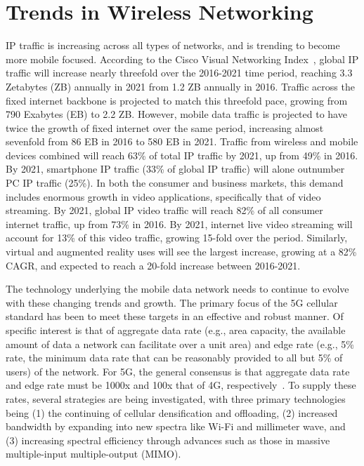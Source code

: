\documentclass[12pt,dvipsnames]{report}
\begin{document}
\section{Trends in Wireless Networking} \label{sec:netreview}

IP traffic is increasing across all types of networks, and is trending to become more mobile focused.  According to the Cisco Visual Networking Index~\cite{ciscoVNI2017}, global IP traffic will increase nearly threefold over the 2016-2021 time period, reaching 3.3 Zetabytes (ZB) annually in 2021 from 1.2 ZB annually in 2016.  Traffic across the fixed internet backbone is projected to match this threefold pace, growing from 790 Exabytes (EB) to 2.2 ZB.  However, mobile data traffic is projected to have twice the growth of fixed internet over the same period, increasing almost sevenfold from 86 EB in 2016 to 580 EB in 2021.  Traffic from wireless and mobile devices combined will reach 63\% of total IP traffic by 2021, up from 49\% in 2016.  By 2021, smartphone IP traffic (33\% of global IP traffic) will alone outnumber PC IP traffic (25\%).  In both the consumer and business markets, this demand includes enormous growth in video applications, specifically that of video streaming.  By 2021, global IP video traffic will reach 82\% of all consumer internet traffic, up from 73\% in 2016.  By 2021, internet live video streaming will account for 13\% of this video traffic, growing 15-fold over the period.  Similarly, virtual and augmented reality uses will see the largest increase, growing at a 82\% CAGR, and expected to reach a 20-fold increase between 2016-2021.

The technology underlying the mobile data network needs to continue to evolve with these changing trends and growth.  The primary focus of the 5G cellular standard has been to meet these targets in an effective and robust manner.  Of specific interest is that of aggregate data rate (e.g., area capacity, the available amount of data a network can facilitate over a unit area) and edge rate (e.g., 5\% rate, the minimum data rate that can be reasonably provided to all but 5\% of users) of the network.  For 5G, the general consensus is that aggregate data rate and edge rate must be 1000x and 100x that of 4G, respectively~\cite{6824752}.  To supply these rates, several strategies are being investigated, with three primary technologies being (1) the continuing of cellular densification and offloading, (2) increased bandwidth by expanding into new spectra like Wi-Fi and millimeter wave, and (3) increasing spectral efficiency through advances such as those in massive multiple-input multiple-output (MIMO).
\end{document}
